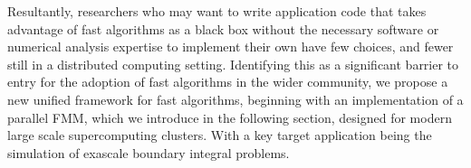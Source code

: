 Resultantly, researchers who may want to write application code that takes advantage of fast algorithms as a black box without the necessary software or numerical analysis expertise to implement their own have few choices, and fewer still in a distributed computing setting. Identifying this as a significant barrier to entry for the adoption of fast algorithms in the wider community, we propose a new unified framework for fast algorithms, beginning with an implementation of a parallel FMM, which we introduce in the following section, designed for modern large scale supercomputing clusters. With a key target application being the simulation of exascale boundary integral problems.
